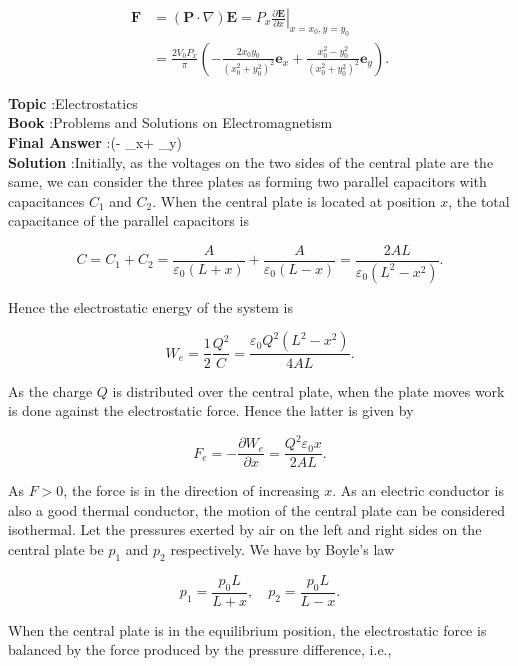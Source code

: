 \documentclass[10pt]{article}
\begin{document}
$$
\begin{aligned}
\boldsymbol{F} &=(\mathbf{P} \cdot \nabla) \mathbf{E}=\left.P_{x} \frac{\partial \mathbf{E}}{\partial x}\right|_{x=x_{0}, y=y_{0}} \\
&=\frac{2 V_{0} P_{x}}{\pi}\left(-\frac{2 x_{0} y_{0}}{\left(x_{0}^{2}+y_{0}^{2}\right)^{2}} \mathbf{e}_{x}+\frac{x_{0}^{2}-y_{0}^{2}}{\left(x_{0}^{2}+y_{0}^{2}\right)^{2}} \mathbf{e}_{y}\right) .
\end{aligned}
$$

\textbf{Topic} :Electrostatics\\
\textbf{Book} :Problems and Solutions on Electromagnetism\\
\textbf{Final Answer} :\left(- _{x}+ _{y}\right)\\


\textbf{Solution} :Initially, as the voltages on the two sides of the central plate are the same, we can consider the three plates as forming two parallel capacitors with capacitances $C_{1}$ and $C_{2}$. When the central plate is located at position $x$, the total capacitance of the parallel capacitors is

$$
C=C_{1}+C_{2}=\frac{A}{\varepsilon_{0}(L+x)}+\frac{A}{\varepsilon_{0}(L-x)}=\frac{2 A L}{\varepsilon_{0}\left(L^{2}-x^{2}\right)} .
$$

Hence the electrostatic energy of the system is

$$
W_{e}=\frac{1}{2} \frac{Q^{2}}{C}=\frac{\varepsilon_{0} Q^{2}\left(L^{2}-x^{2}\right)}{4 A L} .
$$

As the charge $Q$ is distributed over the central plate, when the plate moves work is done against the electrostatic force. Hence the latter is given by

$$
F_{e}=-\frac{\partial W_{e}}{\partial x}=\frac{Q^{2} \varepsilon_{0} x}{2 A L} .
$$

As $F>0$, the force is in the direction of increasing $x$. As an electric conductor is also a good thermal conductor, the motion of the central plate can be considered isothermal. Let the pressures exerted by air on the left and right sides on the central plate be $p_{1}$ and $p_{2}$ respectively. We have by Boyle's law

$$
p_{1}=\frac{p_{0} L}{L+x}, \quad p_{2}=\frac{p_{0} L}{L-x} .
$$

When the central plate is in the equilibrium position, the electrostatic force is balanced by the force produced by the pressure difference, i.e.,
\end{document}
